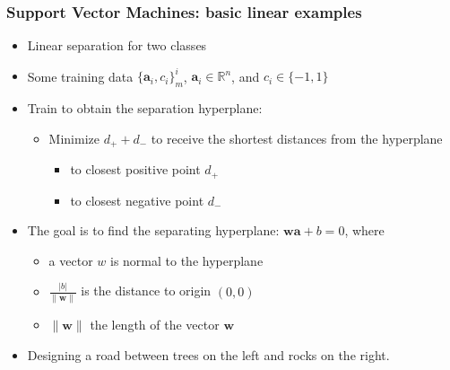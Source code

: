 \documentclass[proffesionalfonts]{beamer}
\begin{document}
\begin{frame}
\frametitle{Support Vector Machines: basic linear examples}
  \begin{itemize}
  \item Linear separation for two classes
  \item Some training data $\{\mathbf a_i, c_i\}^i_m$, $\mathbf a_i \in \mathbb{R}^n$, and $c_i \in \{ -1, 1\}$
  \item Train to obtain the separation hyperplane:
    \begin{itemize}
    \item Minimize $d_+ + d_-$ to receive the shortest distances from the hyperplane 
    \begin{itemize}
    \item to closest positive point $d_+$
    \item to closest negative point $d_-$
    \end{itemize}
    \end{itemize}
  \item The goal is to find the separating hyperplane: $\mathbf w \mathbf a + b = 0$, where
    \begin{itemize}
    \item a vector $w$ is normal to the hyperplane
    \item $\displaystyle\frac{|b|}{\|\mathbf w\|}$ is the distance to origin $(0,0)$
    \item $\|\mathbf w\|$ the length of the vector $\mathbf w$
    \end{itemize}
  \item Designing a road between trees on the left and rocks on the right.
  \end{itemize}
\end{frame}
\end{document}
